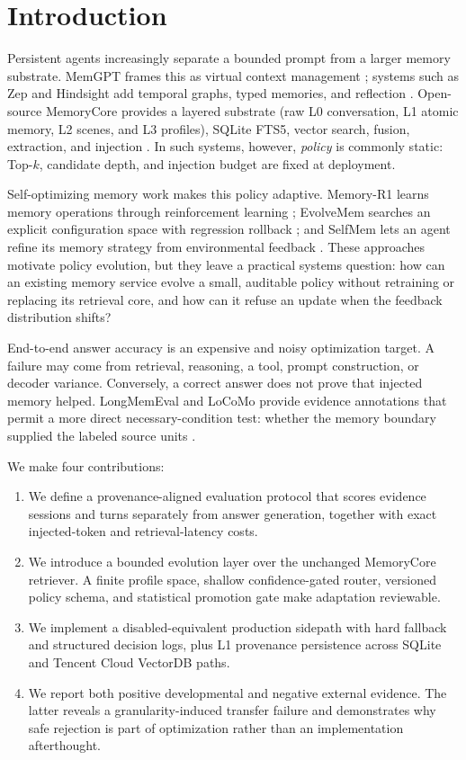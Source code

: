 \documentclass[10pt]{article}
\begin{document}
\section{Introduction}

Persistent agents increasingly separate a bounded prompt from a larger memory
substrate. MemGPT frames this as virtual context management
\citep{packer2023memgpt}; systems such as Zep and Hindsight add temporal graphs,
typed memories, and reflection \citep{rasmussen2025zep,latimer2025hindsight}.
Open-source MemoryCore provides a layered substrate (raw L0 conversation, L1
atomic memory, L2 scenes, and L3 profiles), SQLite FTS5, vector search, fusion,
extraction, and injection \citep{memorycore2026}. In such systems, however,
\emph{policy} is commonly static: Top-$k$, candidate depth, and injection budget
are fixed at deployment.

Self-optimizing memory work makes this policy adaptive. Memory-R1 learns memory
operations through reinforcement learning \citep{yan2025memoryr1}; EvolveMem
searches an explicit configuration space with regression rollback
\citep{liu2026evolvemem}; and SelfMem lets an agent refine its memory strategy
from environmental feedback \citep{yang2026selfmem}. These approaches motivate
policy evolution, but they leave a practical systems question: how can an
existing memory service evolve a small, auditable policy without retraining or
replacing its retrieval core, and how can it refuse an update when the feedback
distribution shifts?

End-to-end answer accuracy is an expensive and noisy optimization target. A
failure may come from retrieval, reasoning, a tool, prompt construction, or
decoder variance. Conversely, a correct answer does not prove that injected
memory helped. LongMemEval and LoCoMo provide evidence annotations that permit
a more direct necessary-condition test: whether the memory boundary supplied
the labeled source units \citep{wu2024longmemeval,maharana2024locomo}.

We make four contributions:

\begin{enumerate}
  \item We define a provenance-aligned evaluation protocol that scores evidence
  sessions and turns separately from answer generation, together with exact
  injected-token and retrieval-latency costs.
  \item We introduce a bounded evolution layer over the unchanged MemoryCore
  retriever. A finite profile space, shallow confidence-gated router, versioned
  policy schema, and statistical promotion gate make adaptation reviewable.
  \item We implement a disabled-equivalent production sidepath with hard
  fallback and structured decision logs, plus L1 provenance persistence across
  SQLite and Tencent Cloud VectorDB paths.
  \item We report both positive developmental and negative external evidence.
  The latter reveals a granularity-induced transfer failure and demonstrates
  why safe rejection is part of optimization rather than an implementation
  afterthought.
\end{enumerate}
\end{document}
